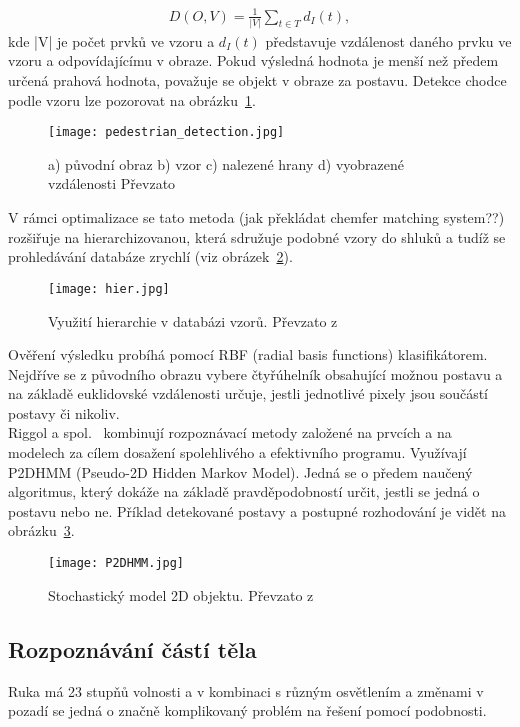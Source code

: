 \begin{eqnarray}
 D(O,V) = \frac{1}{|V|}\sum_{t\in T}^{}d_{I}(t) ,
\end{eqnarray}
kde |V| je počet prvků ve vzoru a $ d_{I}(t) $ představuje vzdálenost daného prvku ve vzoru a odpovídajícímu v obraze. Pokud výsledná hodnota je menší než předem určená prahová hodnota, považuje se objekt v obraze za postavu. Detekce chodce podle vzoru lze pozorovat na obrázku~\ref{pic3}. \\
\newpage
\begin{figure}[h]
\centering
\texttt{[image: pedestrian\_detection.jpg]}
\caption{a) původní obraz b) vzor c) nalezené hrany d) vyobrazené vzdálenosti
Převzato ~\cite{7} }
\label{pic3}
\end{figure}
V rámci optimalizace se tato metoda (jak překládat chemfer matching system??) rozšiřuje na hierarchizovanou, která sdružuje podobné vzory do shluků a tudíž se prohledávání databáze zrychlí (viz obrázek~\ref{pic4}).
\begin{figure}[h]
\centering
\texttt{[image: hier.jpg]}
\caption{Využití hierarchie v databázi vzorů. Převzato z ~\cite{7} }
\label{pic4}
\end{figure}
\newpage

Ověření výsledku probíhá pomocí RBF (radial basis functions) klasifikátorem. Nejdříve se z původního obrazu vybere čtyřúhelník obsahující možnou postavu a na základě euklidovské vzdálenosti určuje, jestli jednotlivé pixely jsou součástí postavy či nikoliv.\\

Riggol a spol.~\cite{11} kombinují rozpoznávací metody založené na prvcích a na modelech za cílem dosažení spolehlivého a efektivního programu. Využívají P2DHMM (Pseudo-2D Hidden Markov Model). Jedná se o předem naučený algoritmus, který dokáže na základě pravděpodobností určit, jestli se jedná o postavu nebo ne. Příklad detekované postavy a postupné rozhodování je vidět na obrázku~\ref{pic5}.\\
\begin{figure}[h]
\centering
\texttt{[image: P2DHMM.jpg]}
\caption{Stochastický model 2D objektu. Převzato z ~\cite{11} } %
\label{pic5}
\end{figure}


\subsection{Rozpoznávání částí těla}
Ruka má 23 stupňů volnosti a v kombinaci s různým osvětlením a změnami v pozadí se jedná o značně komplikovaný problém na řešení pomocí podobnosti.\\


